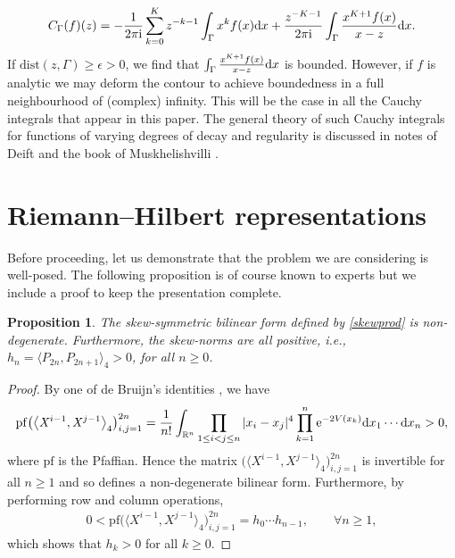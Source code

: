 \documentclass[pdftex]{sigma}
\numberwithin{equation}{section}
\newtheorem{Proposition}[Theorem]{Proposition}
\begin{document}
\begin{enumerate}
\begin{align*}
C_\Gamma (f)(z) = - \frac{1}{2\pi {\rm i}} \sum_{k=0}^K z^{-k-1} \int_\Gamma x^k f(x) {\rm d}x +\frac{z^{-K-1}}{2\pi {\rm i} } \int_\Gamma \frac{ x^{K+1} f(x)}{x-z} {\rm d}x .
\end{align*}
If $\mathrm{dist}(z,\Gamma) \geq \epsilon > 0$, we find that $\int_\Gamma \frac{ x^{K+1} f(x)}{x-z} {\rm d}x$ is bounded. However, if $f$ is analytic we may deform the contour to achieve boundedness in a full neighbourhood of (complex) infinity. This will be the case in all the Cauchy integrals that appear in this paper. The general theory of such Cauchy integrals for functions of varying degrees of decay and regularity is discussed in notes of Deift \cite{deift2019riemannhilbert} and the book of Muskhelishvilli \cite{singular}.
\end{enumerate}

\section{Riemann--Hilbert representations}\label{rhpsection}

Before proceeding, let us demonstrate that the problem we are considering is well-posed. The following proposition is of course known to experts but we include a proof to keep the presentation complete.
\begin{Proposition} The skew-symmetric bilinear form defined by \eqref{skewprod} is non-degenerate. Furthermore, the skew-norms are all positive, i.e., $h_n = \langle P_{2n}, P_{2n+1} \rangle_4 > 0$, for all $n \geq 0$.
\end{Proposition}
\begin{proof}
By one of de Bruijn's identities \cite{debruijn}, we have
\begin{equation*}
\mathrm{pf} \big( \big\langle \mathit{X}^{i-1}, \mathit{X}^{j-1} \big\rangle_4 \big)_{i,j=1}^{2n} = \frac{1}{n!} \int_{\mathbb{R}^n} \prod_{1 \leq i < j \leq n} |x_i - x_j|^4 \prod_{k=1}^n {\rm e}^{-2V(x_k)} {\rm d} x_1 \cdots {\rm d}x_n > 0,
\end{equation*}
where $\mathrm{pf}$ is the Pfaffian. Hence the matrix $\big( \big\langle \mathit{X}^{i-1}, \mathit{X}^{j-1} \big\rangle_4 \big)_{i,j=1}^{2n}$ is invertible for all $n \geq 1$ and so defines a non-degenerate bilinear form. Furthermore, by performing row and column operations,
 \begin{align*}
0 < \mathrm{pf} \big( \big\langle \mathit{X}^{i-1}, \mathit{X}^{j-1} \big\rangle_4 \big)_{i,j=1}^{2n} = h_0 \cdots h_{n-1},\qquad \forall n \geq 1,
\end{align*}
which shows that $h_k > 0$ for all $k \geq 0$.
\end{proof}
\end{document}
